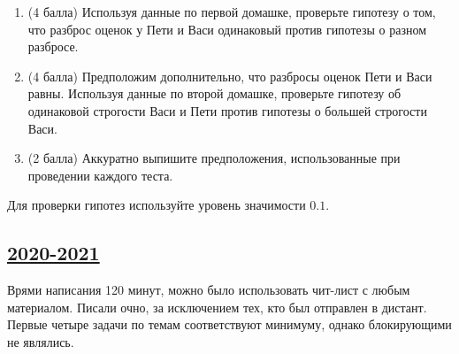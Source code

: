 \begin{enumerate}
	\begin{enumerate}
		\item (4 балла) Используя данные по первой домашке, проверьте гипотезу о том, что разброс оценок у Пети и Васи одинаковый против гипотезы о разном разбросе.
		\item (4 балла) Предположим дополнительно, что разбросы оценок Пети и Васи равны. Используя данные по второй домашке, проверьте гипотезу об одинаковой строгости Васи и Пети против гипотезы о большей строгости Васи.
		\item (2 балла) Аккуратно выпишите предположения, использованные при проведении каждого теста.  
	\end{enumerate}
		
	Для проверки гипотез используйте уровень значимости $0.1$. 
	
	 
	\end{enumerate}
	

\subsection[2020-2021]{\hyperref[sec:sol_kr_04_2020_2021]{2020-2021}}
\label{sec:kr_04_2020_2021}

Врями написания 120 минут, можно было использовать 
чит-лист с любым материалом. Писали очно, 
за исключением тех, кто был отправлен в дистант. 
Первые четыре задачи по темам соответствуют минимуму, однако блокирующими не являлись. 



